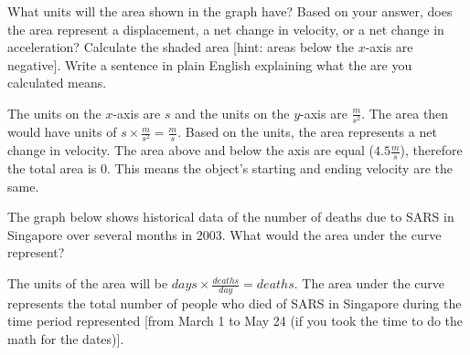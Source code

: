 \begin{Exercise}[label=units1]
What units will the area shown in the graph have? Based on your answer, does the area represent a displacement, a net change in velocity, or a net change in acceleration? Calculate the shaded area [hint: areas below the $x$-axis are negative]. Write a sentence in plain English explaining what the are you calculated means.\\
\end{Exercise}

\begin{Answer}[ref=units1]
The units on the $x$-axis are $s$ and the units on the $y$-axis are $\frac{m}{s^2}$. The area then would have units of $s \times \frac{m}{s^2}=\frac{m}{s}$. Based on the units, the area represents a net change in velocity. The area above and below the axis are equal ($4.5 \frac{m}{s}$), therefore the total area is $0$. This means the object's starting and ending velocity are the same. 
\end{Answer}

\begin{Exercise}[label=units2]
	The graph below shows historical data of the number of deaths due to SARS in Singapore over several months in 2003. What would the area under the curve represent?\\
	
\end{Exercise}

\begin{Answer}[ref=units2]
	The units of the area will be $days \times \frac{deaths}{day}=deaths$. The area under the curve represents the total number of people who died of SARS in Singapore during the time period represented [from March 1 to May 24 (if you took the time to do the math for the dates)]. 
\end{Answer}

